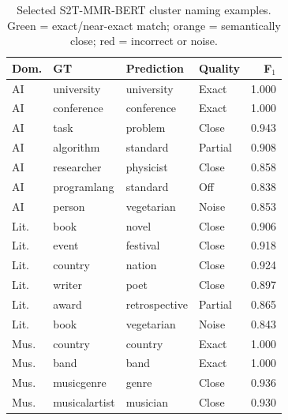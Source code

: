 \documentclass[11pt,a4paper]{article}
\begin{document}
\begin{table}[h]
\centering
\caption{Selected S2T-MMR-BERT cluster naming examples.
\textcolor{green!60!black}{Green} = exact/near-exact match;
\textcolor{orange!70!black}{orange} = semantically close;
\textcolor{red!70!black}{red} = incorrect or noise.}
\label{tab:examples}
\setlength{\tabcolsep}{4pt}
\small
\begin{tabularx}{\textwidth}{l l l l r}
\toprule
\textbf{Dom.} & \textbf{GT} & \textbf{Prediction} & \textbf{Quality} & \textbf{F$_1$} \\
\midrule
AI   & university    & \textcolor{green!60!black}{university}   & Exact   & 1.000 \\
AI   & conference    & \textcolor{green!60!black}{conference}   & Exact   & 1.000 \\
AI   & task          & \textcolor{orange!70!black}{problem}     & Close   & 0.943 \\
AI   & algorithm     & \textcolor{orange!70!black}{standard}    & Partial & 0.908 \\
AI   & researcher    & \textcolor{orange!70!black}{physicist}   & Close   & 0.858 \\
AI   & programlang   & \textcolor{red!70!black}{standard}       & Off     & 0.838 \\
AI   & person        & \textcolor{red!70!black}{vegetarian}     & Noise   & 0.853 \\
\midrule
Lit. & book          & \textcolor{orange!70!black}{novel}       & Close   & 0.906 \\
Lit. & event         & \textcolor{orange!70!black}{festival}    & Close   & 0.918 \\
Lit. & country       & \textcolor{orange!70!black}{nation}      & Close   & 0.924 \\
Lit. & writer        & \textcolor{orange!70!black}{poet}        & Close   & 0.897 \\
Lit. & award         & \textcolor{orange!70!black}{retrospective} & Partial & 0.865 \\
Lit. & book          & \textcolor{red!70!black}{vegetarian}     & Noise   & 0.843 \\
\midrule
Mus. & country       & \textcolor{green!60!black}{country}      & Exact   & 1.000 \\
Mus. & band          & \textcolor{green!60!black}{band}         & Exact   & 1.000 \\
Mus. & musicgenre    & \textcolor{orange!70!black}{genre}       & Close   & 0.936 \\
Mus. & musicalartist & \textcolor{orange!70!black}{musician}    & Close   & 0.930 \\

\end{tabularx}
\end{table}
\end{document}
